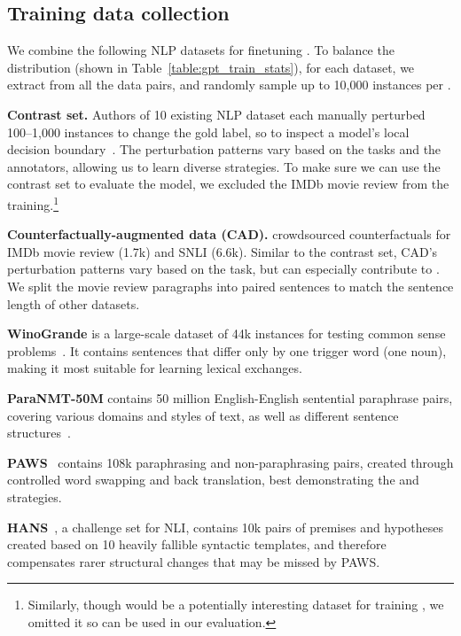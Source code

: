 \subsection{Training data collection}


We combine the following NLP datasets for finetuning \sysname.
To balance the distribution (shown in Table~\ref{table:gpt_train_stats}), for each dataset, we extract \tagstrs from all the data pairs, and randomly sample up to 10,000 instances per \tagstr.

\textbf{Contrast set.}
Authors of 10 existing NLP dataset each manually perturbed 100--1,000 instances to change the gold label, so to inspect a model's local decision boundary~\cite{gardner2020contrast}.
The perturbation patterns vary based on the tasks and the annotators, allowing us to learn diverse strategies.
To make sure we can use the contrast set to evaluate the \sst model, we excluded the IMDb movie review from the training.\footnote{Similarly, though \qqp would be a potentially interesting dataset for training \sysname, we omitted it so \qqp can be used in our evaluation.}


\textbf{Counterfactually-augmented data (CAD).}
\citet{kaushik2019learning} crowdsourced counterfactuals for IMDb movie review (1.7k) and SNLI (6.6k).
Similar to the contrast set, CAD's perturbation patterns vary based on the task, but can especially contribute to .
We split the movie review paragraphs into paired sentences to match the sentence length of other datasets.


\textbf{WinoGrande} is a large-scale dataset of 44k instances for testing common sense problems~\cite{sakaguchi2019winogrande}.
It contains sentences that differ only by one trigger word (\eg one noun), making it most suitable for learning lexical exchanges.

\textbf{ParaNMT-50M} contains 50 million English-English sentential paraphrase pairs, covering various domains and styles of text, as well as different sentence structures~\cite{wieting2017paranmt}. 

\textbf{PAWS}~\cite{zhang2019paws} contains 108k paraphrasing and non-paraphrasing pairs, created through controlled word swapping and back translation, best demonstrating the  and  strategies.


\textbf{HANS}~\cite{mccoy2019right}, a challenge set for NLI, contains 10k pairs of premises and hypotheses created based on 10 heavily fallible syntactic templates, and therefore compensates rarer structural changes that may be missed by PAWS.


